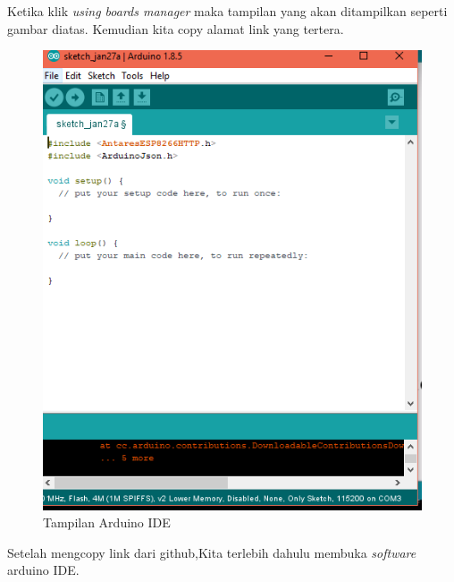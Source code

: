 \begin{enumerate}
    \par Ketika klik \textit{using boards manager} maka tampilan yang akan ditampilkan seperti gambar diatas. Kemudian kita copy alamat link yang tertera.
     \begin{figure}[H]
    \centering
    \includegraphics[width=1\textwidth]{figures/manager9.png}
    \caption{Tampilan Arduino IDE}
    \label{print}
    \end{figure}
    
    \par Setelah mengcopy link dari github,Kita terlebih dahulu membuka \textit{software} arduino IDE.
    

\end{enumerate}
